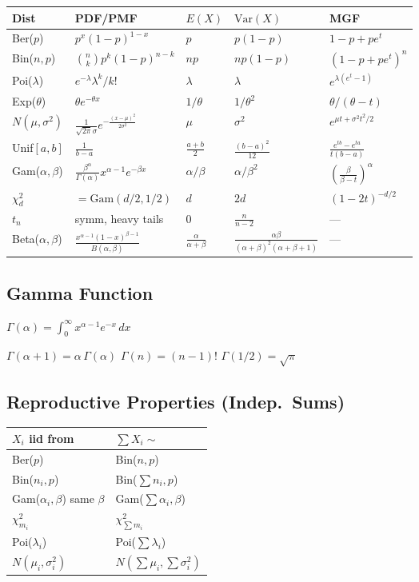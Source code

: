 \documentclass[8pt]{extarticle}
\begin{document}
\begin{multicols}{2}
\begin{tabular}{@{}lllll@{}}
\toprule
\textbf{Dist} & \textbf{PDF/PMF} & $E(X)$ & $\text{Var}(X)$ & \textbf{MGF} \\
\midrule
Ber($p$) & $p^x(1{-}p)^{1-x}$ & $p$ & $p(1{-}p)$ & $1{-}p{+}pe^t$ \\[3pt]
Bin($n,p$) & $\binom{n}{k}p^k(1{-}p)^{n-k}$ & $np$ & $np(1{-}p)$ & $(1{-}p{+}pe^t)^n$ \\[3pt]
Poi($\lambda$) & $e^{-\lambda}\lambda^k/k!$ & $\lambda$ & $\lambda$ & $e^{\lambda(e^t-1)}$ \\[3pt]
Exp($\theta$) & $\theta e^{-\theta x}$ & $1/\theta$ & $1/\theta^2$ & $\theta/(\theta{-}t)$ \\[3pt]
$N(\mu,\sigma^2)$ & $\frac{1}{\sqrt{2\pi}\sigma}e^{-\frac{(x-\mu)^2}{2\sigma^2}}$ & $\mu$ & $\sigma^2$ & $e^{\mu t+\sigma^2t^2/2}$ \\[3pt]
Unif$[a,b]$ & $\frac{1}{b-a}$ & $\frac{a+b}{2}$ & $\frac{(b-a)^2}{12}$ & $\frac{e^{tb}-e^{ta}}{t(b-a)}$ \\[3pt]
Gam($\alpha,\beta$) & $\frac{\beta^\alpha}{\Gamma(\alpha)}x^{\alpha-1}e^{-\beta x}$ & $\alpha/\beta$ & $\alpha/\beta^2$ & $\left(\frac{\beta}{\beta-t}\right)^\alpha$ \\[3pt]
$\chi^2_d$ & $= \text{Gam}(d/2, 1/2)$ & $d$ & $2d$ & $(1{-}2t)^{-d/2}$ \\[3pt]
$t_n$ & symm, heavy tails & $0$ & $\frac{n}{n-2}$ & --- \\[3pt]
Beta($\alpha,\beta$) & $\frac{x^{\alpha-1}(1-x)^{\beta-1}}{B(\alpha,\beta)}$ & $\frac{\alpha}{\alpha+\beta}$ & $\frac{\alpha\beta}{(\alpha{+}\beta)^2(\alpha{+}\beta{+}1)}$ & --- \\
\bottomrule
\end{tabular}

\subsection{Gamma Function}

$\Gamma(\alpha) = \int_0^\infty x^{\alpha-1}e^{-x}\,dx$

$\Gamma(\alpha{+}1) = \alpha\,\Gamma(\alpha)$ \qquad $\Gamma(n) = (n{-}1)!$ \qquad $\Gamma(1/2) = \sqrt{\pi}$

\subsection{Reproductive Properties (Indep.\ Sums)}

\begin{tabular}{@{}ll@{}}
\toprule
\textbf{$X_i$ iid from} & $\sum X_i \sim$ \\
\midrule
Ber($p$) & Bin($n, p$) \\
Bin($n_i, p$) & Bin($\sum n_i, p$) \\
Gam($\alpha_i, \beta$) same $\beta$ & Gam($\sum\alpha_i, \beta$) \\
$\chi^2_{m_i}$ & $\chi^2_{\sum m_i}$ \\
Poi($\lambda_i$) & Poi($\sum\lambda_i$) \\
$N(\mu_i, \sigma_i^2)$ & $N(\sum\mu_i, \sum\sigma_i^2)$ \\
\bottomrule
\end{tabular}


\end{multicols}
\end{document}
